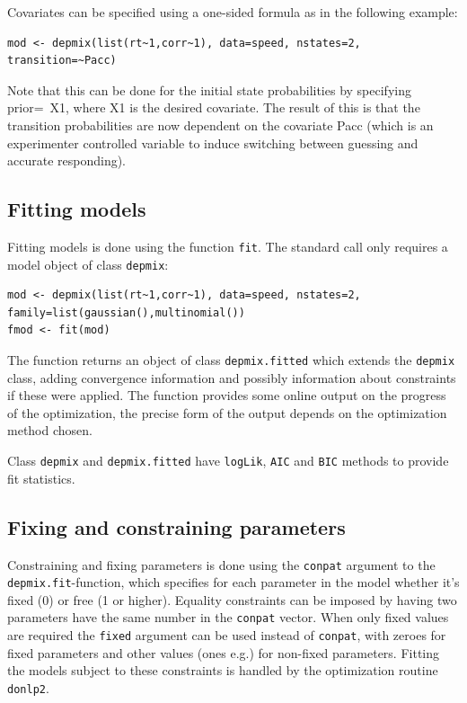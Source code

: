 \documentclass[a4paper]{article}
\newcommand{\code}{\texttt}
\begin{document}

Covariates can be specified using a one-sided formula as in the
following example:

\begin{verbatim}
mod <- depmix(list(rt~1,corr~1), data=speed, nstates=2,
transition=~Pacc)
\end{verbatim}

Note that this can be done for the initial state probabilities by
specifying prior=~X1, where X1 is the desired covariate.  The result
of this is that the transition probabilities are now dependent on the
covariate Pacc (which is an experimenter controlled variable to induce
switching between guessing and accurate responding). 


\subsection{Fitting models}

Fitting models is done using the function \code{fit}.  The standard
call only requires a model object of class \code{depmix}:

\begin{verbatim} 
mod <- depmix(list(rt~1,corr~1), data=speed, nstates=2, 
family=list(gaussian(),multinomial())
fmod <- fit(mod)
\end{verbatim}

The function returns an object of class \code{depmix.fitted} which
extends the \code{depmix} class, adding convergence information and
possibly information about constraints if these were applied.  The
function provides some online output on the progress of the
optimization, the precise form of the output depends on the
optimization method chosen.

Class \code{depmix} and \code{depmix.fitted} have \code{logLik},
\code{AIC} and \code{BIC} methods to provide fit statistics. 


\subsection{Fixing and constraining parameters}

Constraining and fixing parameters is done using the \code{conpat}
argument to the \code{depmix.fit}-function, which specifies for each
parameter in the model whether it's fixed (0) or free (1 or higher).
Equality constraints can be imposed by having two parameters have the
same number in the \code{conpat} vector.  When only fixed values are
required the \code{fixed} argument can be used instead of
\code{conpat}, with zeroes for fixed parameters and other values (ones
e.g.) for non-fixed parameters.  Fitting the models subject to these
constraints is handled by the optimization routine \code{donlp2}.
\end{document}
